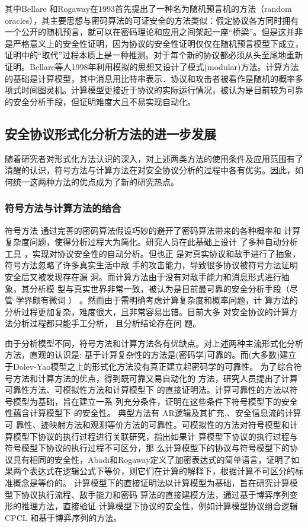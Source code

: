 其中Bellare 和Rogaway在1993首先提出了一种名为随机预言机的方法（random oracles）\cite{Bellare1994}，其主要思想与密码算法的可证安全的方法类似：假定协议各方同时拥有一个公开的随机预言，就可以在密码理论和应用之间架起一座“桥梁”。但是这并非是严格意义上的安全性证明，因为协议的安全性证明仅仅在随机预言模型下成立，证明中的“取代”过程本质上是一种推测。对于每个新的协议都必须从头至尾地重新证明。Bellare等人1998年利用模拟的思想又设计了模式(modular)方法\cite{Larvala}。计算方法的基础是计算模型，其中消息用比特串表示．协议和攻击者被看作是随机的概率多项式时间图灵机。计算模型更接近于协议的实际运行情况，被认为是目前较为可靠的安全分析手段，但证明难度大且不易实现自动化。

\subsection{安全协议形式化分析方法的进一步发展}
随着研究者对形式化方法认识的深入，对上述两类方法的使用条件及应用范围有了清醒的认识，符号方法与计算方法在对安全协议分析的过程中各有优劣。因此，如何统一这两种方法的优点成为了新的研究热点。
\subsubsection{符号方法与计算方法的结合}
符号方法
通过完善的密码算法假设巧妙的避开了密码算法带来的各种概率和
计算复杂度问题，使得分析过程大为简化。研究人员在此基础上设计
了多种自动分析工具
，实现对协议安全性的自动分析。但也正
是对真实协议和敌手进行了抽象， 符号方法忽略了许多真实生活中敌
手的攻击能力，导致很多协议被符号方法证明安全后又被发现存在漏
洞。而计算方法由于没有对敌手能力和消息形式进行抽象，其分析模
型与真实世界非常一致，被认为是目前最可靠的安全分析手段（尽管
学界颇有微词
） 。然而由于需明确考虑计算复杂度和概率问题，计
算方法的分析过程更加复杂，难度很大，且非常容易出错。目前大多
对安全协议的计算方法分析过程都只能手工分析， 且分析结论存在问
题。

由于分析模型不同，符号方法和计算方法各有优缺点。对上述两种主流形式化分析方法，直观的认识是: 基于计算复杂性的方法是(密码学)可靠的。而(大多数)建立于Dolev-Yao模型之上的形式化方法没有真正建立起密码学的可靠性。
为了综合符号方法和计算方法的优点，得到既可靠又易自动化的
方法，研究人员提出了计算可靠性方法、可模拟性方法和计算模型下
的直接证明法。计算可靠性的方法以符号模型为基础，旨在建立一系
列充分条件，证明在这些条件下符号模型下的安全性蕴含计算模型下
的安全性。
典型方法有 AR逻辑及其扩充,、安全信息流的计算可
靠性、迹映射方法和观测等价方法的可靠性。可模拟性的方法对符号模型和计算模型下协议的执行过程进行关联研究，指出如果计
算模型下协议的执行过程与符号模型下协议的执行过程不可区分，那
么计算模型下的协议与符号模型下的协议具有相同的安全性，Abadi和Rogaway定义了加密表达式的简单语言\cite{Abadi2007}，证明了如果两个表达式在逻辑公式下等价，则它们在计算的解释下，根据计算不可区分的标准概念是等价的。
计算模型下的直接证明法以计算模型为基础，旨在研究计算模型下协议执行流程、敌手能力和密码
算法的直接建模方法，通过基于博弈序列变形的推理方法，直接验证
计算模型下协议的安全性，例如计算模型协议组合逻辑 CPCL
和基于博弈序列的方法。

